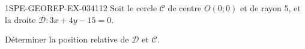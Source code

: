 \begin{exercice}{1SPE-GEOREP-EX-034}{1}{12}
Soit le cercle $\mathcal{C}$ de centre $O(0 ; 0)$ et de rayon $5$, et la droite $\mathcal{D} : 3x + 4y - 15 = 0$.

Déterminer la position relative de $\mathcal{D}$ et $\mathcal{C}$.
\end{exercice}
